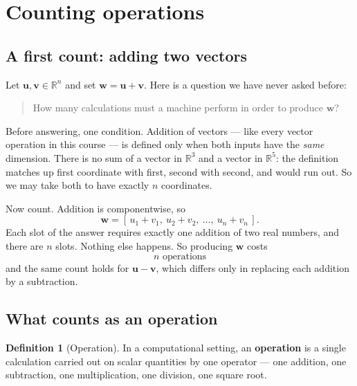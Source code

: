 \documentclass[11pt]{article}
\theoremstyle{plain}
\theoremstyle{definition}
\newtheorem{defn}{Definition}[section]
\theoremstyle{remark}
\newcommand{\R}{\mathbb{R}}
\newcommand{\vc}[1]{\mathbf{#1}}
\begin{document}
\section{Counting operations}
\subsection{A first count: adding two vectors}
Let $\vc{u},\vc{v}\in\R^{n}$ and set $\vc{w}=\vc{u}+\vc{v}$. Here is a question
we have never asked before:

\begin{quote}
How many calculations must a machine perform in order to produce $\vc{w}$?
\end{quote}

\noindent Before answering, one condition. Addition of vectors --- like every
vector operation in this course --- is defined only when both inputs have the
\emph{same} dimension. There is no sum of a vector in $\R^{3}$ and a vector in
$\R^{5}$: the definition matches up first coordinate with first, second with
second, and would run out. So we may take both to have exactly $n$ coordinates.

Now count. Addition is componentwise, so
\[
  \vc{w} = [\,u_1+v_1,\ u_2+v_2,\ \dots,\ u_n+v_n\,] .
\]
Each slot of the answer requires exactly one addition of two real numbers, and
there are $n$ slots. Nothing else happens. So producing $\vc{w}$ costs
\[
  \boxed{\,n \text{ operations}\,}
\]
and the same count holds for $\vc{u}-\vc{v}$, which differs only in replacing
each addition by a subtraction.

\subsection{What counts as an operation}
\begin{defn}[Operation]
In a computational setting, an \textbf{operation} is a single calculation
carried out on scalar quantities by one operator --- one addition, one
subtraction, one multiplication, one division, one square root.
\end{defn}
\end{document}

